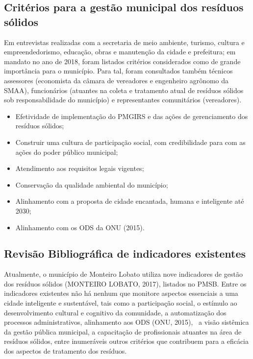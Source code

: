 	
	\subsection{Critérios para a gestão municipal dos resíduos sólidos}
	
	Em entrevistas realizadas com a secretaria de meio ambiente, turismo, cultura e empreendedorismo, educação, obras e manutenção da cidade e prefeitura; em mandato no ano de 2018, foram listados critérios considerados como de grande importância para o município. Para tal, foram consultados também técnicos assessores (economista da câmara de vereadores e engenheiro agrônomo da SMAA), funcionários (atuantes na coleta e tratamento atual de resíduos sólidos sob responsabilidade do município) e representantes comunitários (vereadores).
	
	\begin{itemize}
		\item Efetividade de implementação do PMGIRS e das ações de gerenciamento dos resíduos sólidos;
		\item Construir uma cultura de participação social, com credibilidade para com as ações do poder público municipal;
		\item Atendimento aos requisitos legais vigentes;
		\item Conservação da qualidade ambiental do município;
		\item Alinhamento com a proposta de cidade encantada, humana e inteligente até 2030;
		\item Alinhamento com os ODS da ONU (2015).
	\end{itemize}
	
	\subsection{Revisão Bibliográfica de indicadores existentes }
	
	Atualmente, o município de Monteiro Lobato utiliza nove indicadores de gestão dos resíduos sólidos (MONTEIRO LOBATO, 2017), listados no PMSB.
	Entre os indicadores existentes não há nenhum que monitore aspectos essenciais a uma cidade inteligente e sustentável, tais como a participação social, o estímulo ao desenvolvimento cultural e cognitivo da comunidade, a automatização dos processos administrativos, alinhamento aos ODS (ONU, 2015),  a visão sistêmica da gestão pública municipal, a capacitação de profissionais atuantes na área de resíduos sólidos, entre inumeráveis outros critérios que contribuem para a eficácia dos aspectos de tratamento dos resíduos.
	
